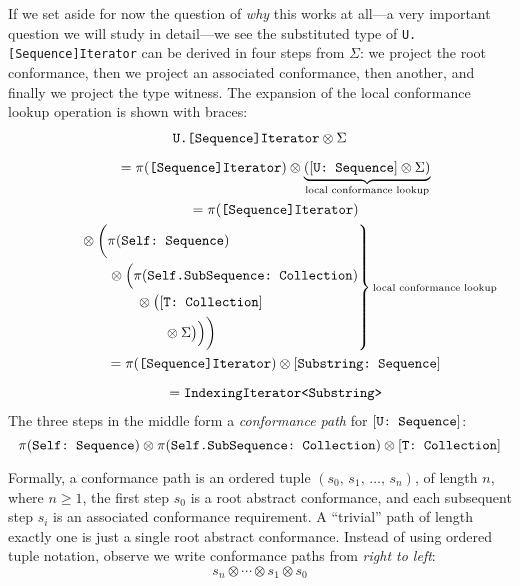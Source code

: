 \documentclass[../generics]{subfiles}
\begin{document}
If we set aside for now the question of \emph{why} this works at all---a very important question we will study in detail---we see the substituted type of \verb|U.[Sequence]Iterator| can be derived in four steps from $\Sigma$: we project the root conformance, then we project an associated conformance, then another, and finally we project the type witness. The expansion of the local conformance lookup operation is shown with braces:
\begin{gather*}
\texttt{U.[Sequence]Iterator} \otimes \Sigma\\[\medskipamount]
\qquad {} = \AssocType{[Sequence]Iterator} \otimes \underbrace{(\ConfReq{U}{Sequence} \otimes \Sigma)}_{\text{\scriptsize local conformance lookup}}\\
\qquad {} = \AssocType{[Sequence]Iterator}\\
\qquad \qquad \begin{rcases*}
{} \otimes \biggl(\AssocConf{Self}{Sequence}\\
\qquad {} \otimes \Bigl(\AssocConf{Self.SubSequence}{Collection}\\
\qquad \qquad {} \otimes \bigl(\ConfReq{T}{Collection}\\
\qquad \qquad \qquad {} \otimes \Sigma\bigr)\Bigr)\biggr)
\end{rcases*}\text{\scriptsize local conformance lookup}\\
\qquad {} = \AssocType{[Sequence]Iterator} \otimes \ConfReq{Substring}{Sequence}\\[\medskipamount]
\qquad {} = \texttt{IndexingIterator<Substring>}
\end{gather*}
%
The three steps in the middle form a \emph{conformance path} for $[\texttt{U:~Sequence}]$:
\[\pi(\texttt{Self:~Sequence}) \otimes \pi(\texttt{Self.SubSequence:~Collection}) \otimes [\texttt{T:~Collection}]\]

Formally, a conformance path is an ordered tuple $(s_0,\,s_1,\,\ldots,\,s_n)$, of length $n$, where $n\geq 1$, the first step $s_0$ is a root abstract conformance, and each subsequent step $s_i$ is an associated conformance requirement. A ``trivial'' path of length exactly one is just a single root abstract conformance. Instead of using ordered tuple notation, observe we write conformance paths from \emph{right to left}:
\[s_n\otimes\cdots\otimes s_1 \otimes s_0\]
\end{document}
